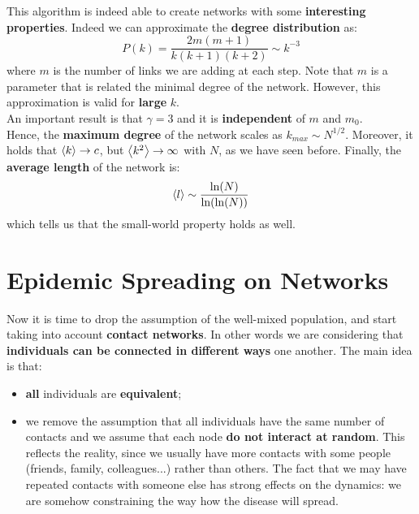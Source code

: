 \documentclass[../main/main.tex]{subfiles}
\begin{document}
This algorithm is indeed able to create networks with some \textbf{interesting properties}. Indeed we can approximate the \textbf{degree distribution} as:
\begin{equation*}
  P(k) = \frac{2 m (m +1)}{k(k+1)(k+2)} \sim k^{-3}
\end{equation*}
where $m$ is the number of links we are adding at each step. Note that $m$ is a parameter that is related the minimal degree of the network. However, this approximation is valid for \textbf{large} \( k \).\\
An important result is that \( \gamma =3  \) and it is \textbf{independent} of \( m \) and \( m_0 \).\\
Hence, the \textbf{maximum degree} of the network scales as \( k_{max} \sim N^{1/2} \). Moreover, it holds that \( \expval{k} \rightarrow c \), but \( \expval{k^2} \rightarrow \infty   \) with \( N \), as we have seen before.
Finally, the \textbf{average length} of the network is:
\begin{equation*}
  \expval{l} \sim \frac{\ln (N)}{\ln (\ln (N))}
\end{equation*}
which tells us that the small-world property holds as well.










\chapter{Epidemic Spreading on Networks}

Now it is time to drop the assumption of the well-mixed population, and start taking into account \textbf{contact networks}. In other words we are considering that \textbf{individuals can be connected in different ways} one another.
The main idea is that:
\begin{itemize}
\item \textbf{all} individuals are \textbf{equivalent};
\item we remove the assumption that all individuals have the same number of contacts and we assume that each node \textbf{do not interact at random}. This reflects the reality, since we usually have more contacts with some people (friends, family, colleagues...) rather than others. The fact that we may have repeated contacts with someone else has strong effects on the dynamics: we are somehow constraining the way how the disease will spread.
\end{itemize}
\end{document}
